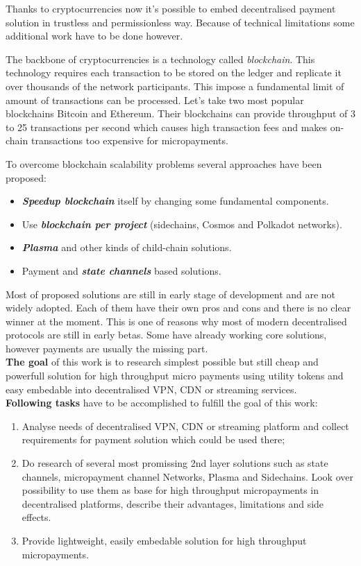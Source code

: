 \documentclass[a4paper,12pt]{article}
\begin{document}
Thanks to cryptocurrencies now it's possible to embed decentralised payment
solution in trustless and permissionless way. Because of technical limitations 
some additional work have to be done however.

The backbone of cryptocurrencies is a technology called \textit{blockchain}. 
This technology requires each transaction to be stored on the ledger and 
replicate it over thousands of the network participants. This impose a 
fundamental limit of amount of transactions can be processed. Let's take two 
most popular blockchains Bitcoin and Ethereum. Their blockchains can provide
throughput of 3 to 25 transactions per second which causes high transaction 
fees and makes on-chain transactions too expensive for micropayments.

To overcome blockchain scalability problems several approaches have been 
proposed: 

\begin{itemize}
    \item \textit{\textbf{Speedup blockchain}} itself by changing some 
    fundamental components.
    \item Use \textit{\textbf{blockchain per project}} (sidechains, Cosmos and 
    Polkadot networks).
    \item \textit{\textbf{Plasma}} and other kinds of child-chain solutions.
    \item Payment and \textit{\textbf{state channels}} based solutions.
\end{itemize}

Most of proposed solutions are still in early stage of development and are not 
widely adopted. Each of them have their own pros and cons and there is no clear 
winner at the moment. This is one of reasons why most of modern decentralised 
protocols are still in early betas. Some have already working core solutions, 
however payments are usually the missing part. \\

\textbf{The goal} of this work is to research simplest possible but still cheap 
and powerfull solution for high throughput micro payments using utility tokens
and easy embedable into decentralised VPN, CDN or streaming services.\\

\textbf{Following tasks} have to be accomplished to fulfill the goal of this work:
\begin{enumerate}
    \item Analyse needs of decentralised VPN, CDN or streaming platform and 
    collect requirements for payment solution which could be used there;
    \item Do research of several most promissing 2nd layer solutions such as 
    state channels, micropayment channel Networks, Plasma and Sidechains. Look
    over possibility to use them as base for high throughput micropayments in 
    decentralised platforms, describe their advantages, limitations and side 
    effects.
    \item Provide lightweight, easily embedable solution for high throughput 
    micropayments.
\end{enumerate}
\end{document}
